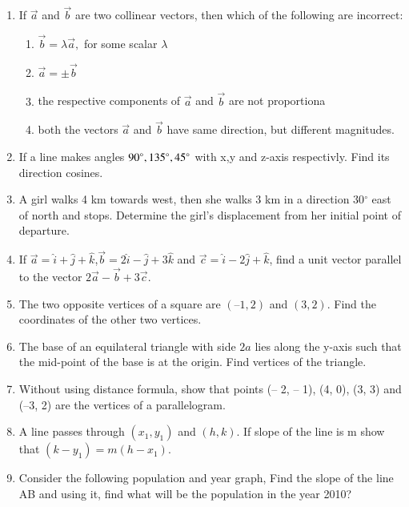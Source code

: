 \begin{enumerate}[label=\thesection.\arabic*,ref=\thesection.\theenumi]
\item If $\vec{a}$ and $\vec{b}$ are two collinear vectors, then which of the following are incorrect:
\begin{enumerate}
    \item $\vec{b}=\lambda\vec{a},$
 for some scalar $\lambda$
    \item $\vec{a}=\pm\vec{b}$
    \item the respective components of $\vec{a}$ and $\vec{b}$ are not proportiona
    \item both the vectors $\vec{a}$ and $\vec{b}$ have same direction, but different magnitudes.
\end{enumerate}
	\item If a line makes angles $90\degree,135\degree,45\degree$ with x,y and z-axis respectivly. Find its direction cosines.
		\\
		\solution
		
\item A girl walks 4 km towards west, then she walks 3 km in a direction 30$^{\circ}$ east of north and stops. Determine the girl's displacement from her initial point of departure.\\
	\solution
		
\item If $\vec{a}=\hat{i}+\hat{j}+\hat{k}$,$\vec{b}=2\hat{i}-\hat{j}+3\hat{k}$ and $\vec{c}=\hat{i}-2\hat{j}+\hat{k}$, find a unit vector parallel to the vector $2\vec{a}-\vec{b}+3\vec{c}$.\\
	\solution
		
\item The two opposite vertices of a square are $(–1, 2)$  and $ (3, 2)$. Find the coordinates of the other two vertices.
\\
	
\item The base of an equilateral triangle with side $2a$ lies along the y-axis such that the mid-point of the base is at the origin. Find vertices of the triangle.
\label{chapters/11/10/1/2}

\item Without using distance formula, show that points (– 2, – 1), (4, 0), (3, 3) and (–3, 2) are the vertices of a parallelogram.
\label{chapters/11/10/1/9}

\item A line passes through $(x_1,y_1)$ and $(h,k)$. If slope of the line is m show that $(k-y_1)=m(h-x_1)$.
\label{chapters/11/10/1/12}

\item Consider the following population and year graph, Find the slope of the line AB and using it, find what will be the population in the year 2010?

\end{enumerate}
